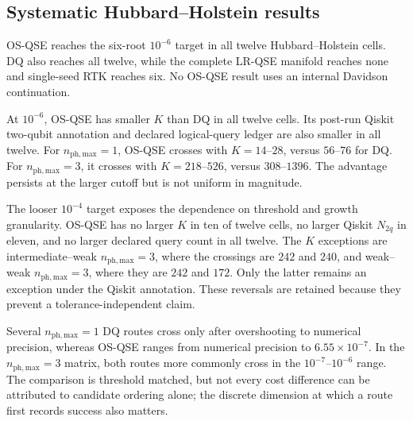 \documentclass[
  reprint,
  amsmath,
  amssymb,
  aps,
  pra,
  nofootinbib,
  superscriptaddress,
  floatfix
]{revtex4-2}
\newcommand{\phmax}{n_{\mathrm{ph,max}}}
\begin{document}
\subsection{Systematic Hubbard--Holstein results}
\label{sec:hh_static_results}

OS-QSE reaches the six-root $10^{-6}$ target in all twelve
Hubbard--Holstein cells.  DQ also reaches all twelve, while the complete LR-QSE
manifold reaches none and single-seed RTK reaches six.  No OS-QSE result uses
an internal Davidson continuation.

At $10^{-6}$, OS-QSE has smaller $K$ than DQ in all twelve cells.  Its
post-run Qiskit two-qubit annotation and declared logical-query ledger are
also smaller in all twelve.  For $\phmax=1$, OS-QSE crosses with
$K=14$--$28$, versus $56$--$76$ for DQ.  For $\phmax=3$, it crosses with
$K=218$--$526$, versus $308$--$1396$.  The advantage persists at the larger
cutoff but is not uniform in magnitude.

The looser $10^{-4}$ target exposes the dependence on threshold and growth
granularity.  OS-QSE has no larger $K$ in ten of twelve cells, no larger
Qiskit $N_{2q}$ in eleven, and no larger declared query count in all twelve.
The $K$ exceptions are intermediate--weak $\phmax=3$, where the crossings are
$242$ and $240$, and weak--weak $\phmax=3$, where they are $242$ and $172$.
Only the latter remains an exception under the Qiskit annotation.  These
reversals are retained because they prevent a tolerance-independent claim.

Several $\phmax=1$ DQ routes cross only after overshooting to numerical
precision, whereas OS-QSE ranges from numerical precision to
$6.55\times10^{-7}$.  In the $\phmax=3$ matrix, both routes more commonly
cross in the $10^{-7}$--$10^{-6}$ range.  The comparison is threshold matched,
but not every cost difference can be attributed to candidate ordering alone;
the discrete dimension at which a route first records success also matters.
\end{document}
